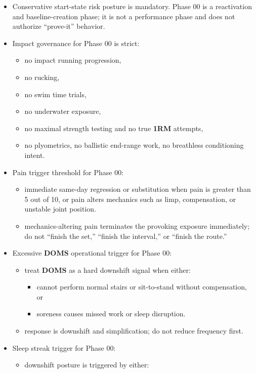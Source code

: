 \documentclass[10pt]{article}
\begin{document}
\begin{itemize}
\item Conservative start-state risk posture is mandatory. Phase 00 is a reactivation and baseline-creation phase; it is not a performance phase and does not authorize “prove-it” behavior.
\item Impact governance for Phase 00 is strict:
  \begin{itemize}
  \item no impact running progression,
  \item no rucking,
  \item no swim time trials,
  \item no underwater exposure,
  \item no maximal strength testing and no true \textbf{1RM} attempts,
  \item no plyometrics, no ballistic end-range work, no breathless conditioning intent.
  \end{itemize}
\item Pain trigger threshold for Phase 00:
  \begin{itemize}
  \item immediate same-day regression or substitution when pain is greater than 5 out of 10, or pain alters mechanics such as limp, compensation, or unstable joint position.
  \item mechanics-altering pain terminates the provoking exposure immediately; do not “finish the set,” “finish the interval,” or “finish the route.”
  \end{itemize}
\item Excessive \textbf{DOMS} operational trigger for Phase 00:
  \begin{itemize}
  \item treat \textbf{DOMS} as a hard downshift signal when either:
    \begin{itemize}
    \item cannot perform normal stairs or sit-to-stand without compensation, or
    \item soreness causes missed work or sleep disruption.
    \end{itemize}
  \item response is downshift and simplification; do not reduce frequency first.
  \end{itemize}
\item Sleep streak trigger for Phase 00:
  \begin{itemize}
  \item downshift posture is triggered by either:

\end{itemize}
\end{itemize}
\end{document}
